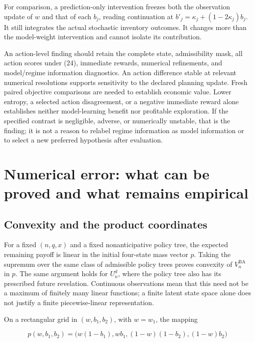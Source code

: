 \documentclass[10pt,a4paper]{article}
\begin{document}
For comparison, a prediction-only intervention freezes both the observation
update of $w$ and that of each $b_j$, reading continuation at
$b'_j=\kappa_j+(1-2\kappa_j)b_j$. It still integrates the actual stochastic
inventory outcomes. It changes more than the model-weight intervention and
cannot isolate its contribution.

An action-level finding should retain the complete state, admissibility mask,
all action scores under (24), immediate rewards, numerical refinements, and
model/regime information diagnostics. An action difference stable at relevant
numerical resolutions supports sensitivity to the declared planning update.
Fresh paired objective comparisons are needed to establish economic value.
Lower entropy, a selected action disagreement, or a negative immediate reward
alone establishes neither model-learning benefit nor profitable exploration.
If the specified contrast is negligible, adverse, or numerically unstable,
that is the finding; it is not a reason to relabel regime information as model
information or to select a new preferred hypothesis after evaluation.

\section{Numerical error: what can be proved and what remains empirical}

\subsection{Convexity and the product coordinates}

For a fixed $(n,q,x)$ and a fixed nonanticipative policy tree, the expected
remaining payoff is linear in the initial four-state mass vector $p$.
Taking the supremum over the same class of admissible policy trees proves
convexity of $V_n^{\mathrm{BA}}$ in $p$. The same argument holds for
$U^d_n$, where the policy tree also has its prescribed future revelation.
Continuous observations mean that this need not be a maximum of finitely many
linear functions; a finite latent state space alone does not justify a finite
piecewise-linear representation.

On a rectangular grid in $(w,b_1,b_2)$, with $w=w_1$, the mapping

\begin{equation}
p(w,b_1,b_2)=\big(w(1-b_1),wb_1,(1-w)(1-b_2),(1-w)b_2\big)
\tag{25}
\end{equation}
\end{document}
